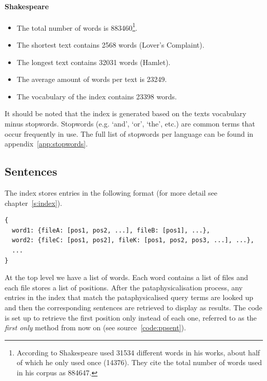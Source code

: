 \paragraph*{Shakespeare}
\begin{itemize}
\vspace{-0.5cm}
  \item The total number of words is \num{883460}\footnote{According to \autocite{Efron1976} Shakespeare used \num{31534} different words in his works, about half of which he only used once (\num{14376}). They cite the total number of words used in his corpus as \num{884647}.}.
  \item The shortest text contains \num{2568} words (Lover's Complaint).
  \item The longest text contains \num{32031} words (Hamlet).
  \item The average amount of words per text is \num{23249}.
  \item The vocabulary of the index contains \num{23398} words.
\end{itemize}

It should be noted that the index is generated based on the texts vocabulary minus stopwords. Stopwords (e.g. `and', `or', `the', etc.) are common terms that occur frequently in use. The full list of stopwords per language can be found in appendix~\ref{app:stopwords}.


\subsection{Sentences}
\label{s:sents}

The index stores entries in the following format (for more detail see chapter~\ref{s:index}).

\begin{verbatim}
{
  word1: {fileA: [pos1, pos2, ...], fileB: [pos1], ...},
  word2: {fileC: [pos1, pos2], fileK: [pos1, pos2, pos3, ...], ...},
  ...
}
\end{verbatim}

At the top level we have a list of words. Each word contains a list of files and each file stores a list of positions. After the pataphysicalisation process, any entries in the index that match the pataphysicalised query terms are looked up and then the corresponding sentences are retrieved to display as results. The code is set up to retrieve the first position only instead of each one, referred to as the \emph{first only} method from now on (see source~\ref{code:ppsent}).

